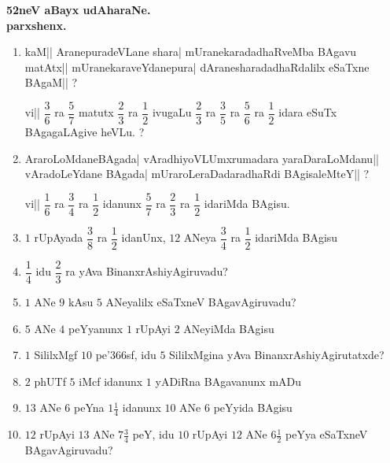 \eject

\begin{center}
{\bf\Large 52neV aBayx udAharaNe.}\\[7pt]
{\large\bf parxshenx.}
\end{center}

\begin{enumerate}[\rm(1)]
\item kaM|| AranepuradeVLane shara| mUranekaradadhaRveMba BAgavu matAtx|| mUranekaraveYdanepura| dAraneshara\-dadhaRdalilx eSaTxne BAgaM|| ?

vi|| $\dfrac{3}{6}$ ra $\dfrac{5}{7}$ matutx $\dfrac{2}{3}$ ra $\dfrac{1}{2}$ ivugaLu $\dfrac{2}{3}$ ra $\dfrac{3}{5}$ ra $\dfrac{5}{6}$ ra $\dfrac{1}{2}$ idara eSuTx BAgagaLAgive heVLu. ?

\item AraroLoMdaneBAgada| vAradhiyoVLUmxrumadara yaraDaraLoMdanu|| vAradoLeYdane BAgada| mUra\-roLeraDadaradhaRdi BAgisaleMteY|| ?

vi|| $\dfrac{1}{6}$ ra $\dfrac{3}{4}$ ra $\dfrac{1}{2}$ idanunx $\dfrac{5}{7}$ ra $\dfrac{2}{3}$ ra $\dfrac{1}{2}$ idariMda BAgisu.

\item $1$ rUpAyada $\dfrac{3}{8}$ ra $\dfrac{1}{2}$ idanUnx, $12$ ANeya $\dfrac{3}{4}$ ra $\dfrac{1}{2}$ idariMda BAgisu

\item $\dfrac{1}{4}$ idu $\dfrac{2}{3}$ ra yAva BinanxrAshiyAgiruvadu?

\item $1$ ANe $9$ kAsu $5$ ANeyalilx eSaTxneV BAgavAgiruvadu?

\item $5$ ANe $4$ peYyanunx $1$ rUpAyi $2$ ANeyiMda BAgisu

\item $1$ SililxMgf $10$ pe\char'366sf, idu $5$ SililxMgina yAva BinanxrAshiyAgirutatxde?

\item $2$ phUTf $5$ iMcf idanunx $1$ yADiRna BAgavanunx mADu

\item $13$ ANe $6$ peYna $1\tfrac{1}{4}$ idanunx $10$ ANe $6$ peYyida BAgisu

\item $12$ rUpAyi $13$ ANe $7\tfrac{3}{4}$ peY, idu $10$ rUpAyi $12$ ANe $6\tfrac{1}{2}$ peYya eSaTxneV BAgavAgiruvadu?
\end{enumerate}
